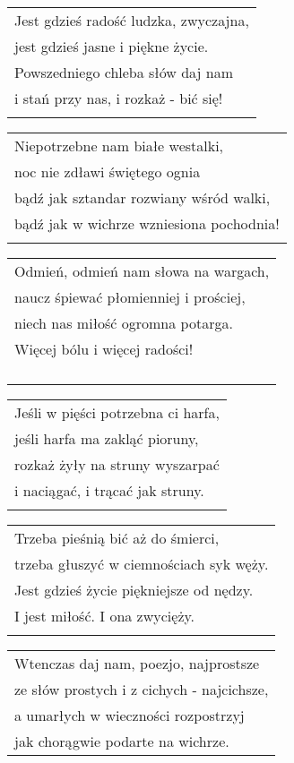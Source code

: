 \documentclass[a5paper]{article}
\begin{document}
\noindent
\begin{tabular}{@{}p{7.50cm}@{}}
Jest gdzieś radość ludzka, zwyczajna, \\
jest gdzieś jasne i piękne życie. \\
Powszedniego chleba słów daj nam \\
i stań przy nas, i rozkaż - bić się! \\ \\
\end{tabular}

\noindent
\begin{tabular}{@{}p{7.50cm}@{}}
Niepotrzebne nam białe westalki, \\
noc nie zdławi świętego ognia \\
bądź jak sztandar rozwiany wśród walki, \\
bądź jak w wichrze wzniesiona pochodnia! \\ \\
\end{tabular}

\noindent
\begin{tabular}{@{}p{7.50cm}@{}}
Odmień, odmień nam słowa na wargach, \\
naucz śpiewać płomienniej i prościej, \\
niech nas miłość ogromna potarga. \\
Więcej bólu i więcej radości! \\ \\ \\ \\ \\
\end{tabular}

\noindent
\begin{tabular}{@{}p{7.50cm}@{}}
Jeśli w pięści potrzebna ci harfa, \\
jeśli harfa ma zakląć pioruny, \\
rozkaż żyły na struny wyszarpać \\ 
i naciągać, i trącać jak struny. \\ \\
\end{tabular}

\noindent
\begin{tabular}{@{}p{7.50cm}@{}}
Trzeba pieśnią bić aż do śmierci, \\
trzeba głuszyć w ciemnościach syk węży. \\
Jest gdzieś życie piękniejsze od nędzy. \\
I jest miłość. I ona zwycięży. \\ \\
\end{tabular}

\noindent
\begin{tabular}{@{}p{7.50cm}@{}}
Wtenczas daj nam, poezjo, najprostsze \\
ze słów prostych i z cichych - najcichsze, \\
a umarłych w wieczności rozpostrzyj \\
jak chorągwie podarte na wichrze. \\
\end{tabular}
\end{document}
